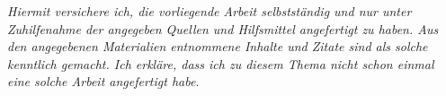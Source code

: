 \documentclass{article}
\begin{document}
\textit{Hiermit versichere ich, die vorliegende Arbeit selbstständig und nur unter Zuhilfenahme der angegeben Quellen und Hilfsmittel angefertigt zu haben. Aus den angegebenen Materialien entnommene Inhalte und Zitate sind als solche kenntlich gemacht. Ich erkläre, dass ich zu diesem Thema nicht schon einmal eine solche Arbeit angefertigt habe.}





\newpage


\label{sec:glossary}
\printglossary
\label{sec:symb}
\printnomenclature
\newpage

\printbibliography[heading=bibintoc]
\end{document}
